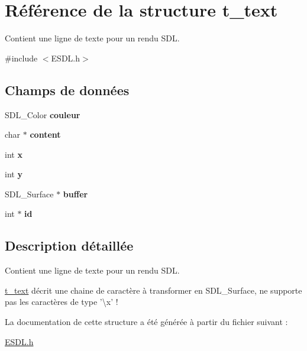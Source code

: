 \hypertarget{structt__text}{\section{Référence de la structure t\+\_\+text}
\label{structt__text}
}


Contient une ligne de texte pour un rendu S\+D\+L.  




{\ttfamily \#include $<$E\+S\+D\+L.\+h$>$}

\subsection*{Champs de données}
\begin{DoxyCompactItemize}
\item 
\hypertarget{structt__text_a6859d875bf9c7427d789676ed80e669c}{S\+D\+L\+\_\+\+Color {\bfseries couleur}}\label{structt__text_a6859d875bf9c7427d789676ed80e669c}

\item 
\hypertarget{structt__text_aeb952cfbcd9113f18dccb87e95df6114}{char $\ast$ {\bfseries content}}\label{structt__text_aeb952cfbcd9113f18dccb87e95df6114}

\item 
\hypertarget{structt__text_a5393f7011379759a26be773c259e5757}{int {\bfseries x}}\label{structt__text_a5393f7011379759a26be773c259e5757}

\item 
\hypertarget{structt__text_ac9c3fd27093baeb2e0237546db17c616}{int {\bfseries y}}\label{structt__text_ac9c3fd27093baeb2e0237546db17c616}

\item 
\hypertarget{structt__text_a6965e597af5af9c9b35051b2ade237ff}{S\+D\+L\+\_\+\+Surface $\ast$ {\bfseries buffer}}\label{structt__text_a6965e597af5af9c9b35051b2ade237ff}

\item 
\hypertarget{structt__text_ad445009642d706d3e23d6cf946667dc1}{int $\ast$ {\bfseries id}}\label{structt__text_ad445009642d706d3e23d6cf946667dc1}

\end{DoxyCompactItemize}


\subsection{Description détaillée}
Contient une ligne de texte pour un rendu S\+D\+L. 

\hyperlink{structt__text}{t\+\_\+text} décrit une chaine de caractère à transformer en S\+D\+L\+\_\+\+Surface, ne supporte pas les caractères de type '\textbackslash{}x' ! 

La documentation de cette structure a été générée à partir du fichier suivant \+:\begin{DoxyCompactItemize}
\item 
\hyperlink{_e_s_d_l_8h}{E\+S\+D\+L.\+h}\end{DoxyCompactItemize}
